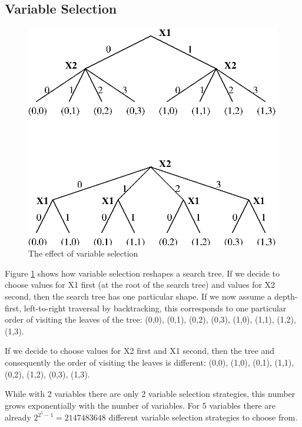 \subsection{Variable Selection}

\begin{figure}
\begin{center}
\includegraphics{search1.eps}
\end{center}
\caption{The effect of variable selection}
\label{figvarsel}
\end{figure}

Figure \ref{figvarsel} shows how variable selection reshapes a search tree.
If we decide to choose values for X1 first (at the root of the search tree)
and values for X2 second, then the search tree has one particular shape.
If we now assume a depth-first, left-to-right traversal by backtracking,
this corresponds to one particular order of visiting the leaves of the tree:
(0,0), (0,1), (0,2), (0,3), (1,0), (1,1), (1,2), (1,3).

If we decide to choose values for X2 first and X1 second, then the tree and
consequently the order of visiting the leaves is different:
(0,0), (1,0), (0,1), (1,1), (0,2), (1,2), (0,3), (1,3).

While with 2 variables there are only 2 variable selection strategies,
this number grows exponentially with the number of variables. For 5
variables there are already $2^{2^{5}-1} = 2147483648$ different variable selection
strategies to choose from.

